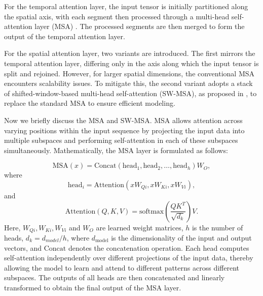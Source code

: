 \documentclass[11pt]{article}
\begin{document}


For the temporal attention layer, the input tensor is initially partitioned along the spatial axis, with each segment then processed through a multi-head self-attention layer (MSA) \citep{vaswani2017attention}. The processed segments are then merged to form the output of the temporal attention layer.


For the spatial attention layer, two variants are introduced. The first mirrors the temporal attention layer, differing only in the axis along which the input tensor is split and rejoined. However, for larger spatial dimensions, the conventional MSA encounters scalability issues. To mitigate this, the second variant adopts a stack of shifted-window-based multi-head self-attention (SW-MSA), as proposed in \citet{liu2021swin}, to replace the standard MSA to ensure efficient modeling.

Now we briefly discuss the MSA and SW-MSA. MSA allows attention across varying positions within the input sequence by projecting the input data into multiple subspaces and performing self-attention in each of these subspaces simultaneously. Mathematically, the MSA layer is formulated as follows:



\begin{equation}
    \text{MSA}(x) = \text{Concat}(\text{head}_1, \text{head}_2, \ldots, \text{head}_h)W_O,
\end{equation}
where 
\begin{equation}
	\text{head}_i = \text{Attention}(xW_{Qi}, xW_{Ki}, xW_{Vi}),
\end{equation}
and
\begin{equation}
    \text{Attention}(Q, K, V) = \text{softmax}\left(\frac{QK^T}{\sqrt{d_k}}\right) V.
\end{equation}
Here, $W_{Qi}, W_{Ki}, W_{Vi}$ and $W_O$ are learned weight matrices, $h$ is the number of heads, $d_k=d_{model}/h$, where $d_{\text{model}}$ is the dimensionality of the input and output vectors, and $\text{Concat}$ denotes the concatenation operation. Each head computes self-attention independently over different projections of the input data, thereby allowing the model to learn and attend to different patterns across different subspaces. The outputs of all heads are then concatenated and linearly transformed to obtain the final output of the MSA layer. 
\end{document}
